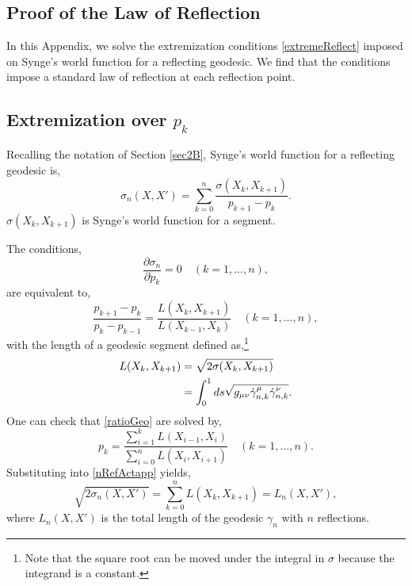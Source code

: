 \documentclass[reprint,amsmath,amssymb,aps,nofootinbib,twocolumn]{revtex4-2}
\begin{document}
\begin{appendix}
\section{Proof of the Law of Reflection}\label{app:extrem}

In this Appendix, we solve the extremization conditions \eqref{extremeReflect} imposed on Synge's world function for a reflecting geodesic. We find that the conditions impose a standard law of reflection at each reflection point.

\subsection{Extremization over $ p_k $}

Recalling the notation of Section \ref{sec2B}, Synge's world function for a reflecting geodesic is,
\begin{equation}
\sigma_n(X,X') = \sum_{k=0}^n \frac{\sigma(X_k,X_{k+1})}{p_{k+1} - p_k}.\label{nRefActapp}
\end{equation}
$\sigma(X_k,X_{k+1})$ is Synge's world function for a segment.

The conditions,
\begin{equation}
\frac{\partial \sigma_n}{\partial p_k} = 0 \quad (k = 1,...,n),
\end{equation}
are equivalent to,
\begin{equation}
\frac{p_{k+1}-p_k}{p_k - p_{k-1}} = \frac{L(X_k,X_{k+1})}{L(X_{k-1},X_{k})} \quad (k = 1,...,n),\label{ratioGeo}
\end{equation}
with the length of a geodesic segment defined as,\footnote{Note that the square root can be moved under the integral in $\sigma$ because the integrand is a constant.}
\begin{equation}
\begin{split}
L(X_{k},X_{k+1})
&= \sqrt{2\sigma(X_{k},X_{k+1})}\\
&= \int_0^1 ds\sqrt{\smash[b]{g_{\mu\nu} \dot{\gamma}_{n,k}^{\mu}\dot{\gamma}_{n,k}^{\nu}}}.\label{lengthDef}
\end{split}
\end{equation}
One can check that \eqref{ratioGeo} are solved by,
\begin{equation}
p_k = \frac{\sum_{i=1}^k L(X_{i-1},X_{i})}{\sum_{i=0}^n L(X_{i},X_{i+1})} \quad (k = 1,...,n).
\end{equation}
Substituting into \eqref{nRefActapp} yields,
\begin{equation}
\sqrt{2\sigma_n(X,X')} = \sum_{k=0}^{n} L(X_{k},X_{k+1}) = L_n(X,X'),
\label{appsqrtsigma}
\end{equation}
where $L_n(X,X')$ is the total length of the geodesic $ \gamma_n $ with $n$ reflections.


\end{appendix}
\end{document}
